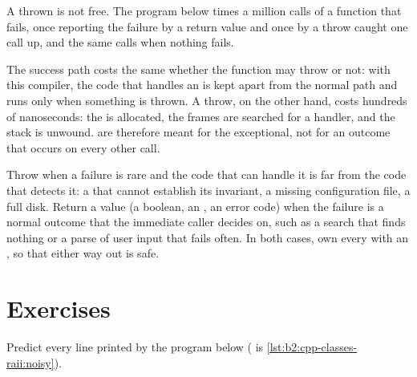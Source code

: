 A thrown  is not free. The program below times a million calls of a function that fails, once reporting
the failure by a return value and once by a throw caught one call up, and the same calls when nothing fails.

\label{lst:b2:cpp-classes-raii:cost}

\label{out:b2:cpp-classes-raii:cost}

The success path costs the same whether the function may throw or not: with this compiler, the code that handles an
 is kept apart from the normal path and runs only when something is thrown. A throw, on the other hand,
costs hundreds of nanoseconds: the   is allocated, the frames are searched for a handler, and the
stack is unwound.  are therefore meant for the exceptional, not for an outcome that occurs on every
other call.

\begin{inpractice}
Throw when a failure is rare and the code that can handle it is far from the code that detects it: a 
that cannot establish its invariant, a missing configuration file, a full disk. Return a value (a boolean, an
, an error code) when the failure is a normal outcome that the immediate caller decides on, such
as a search that finds nothing or a parse of user input that fails often. In both cases, own every  with an
, so that either way out is safe.
\end{inpractice}

\section{Exercises}\label{sec:b2:cpp-classes-raii:exercises}

\begin{exercise}[$\star$]\label{exo:b2:cpp-classes-raii:1}
Predict every line printed by the program below ( is \cref{lst:b2:cpp-classes-raii:noisy}).
\end{exercise}

